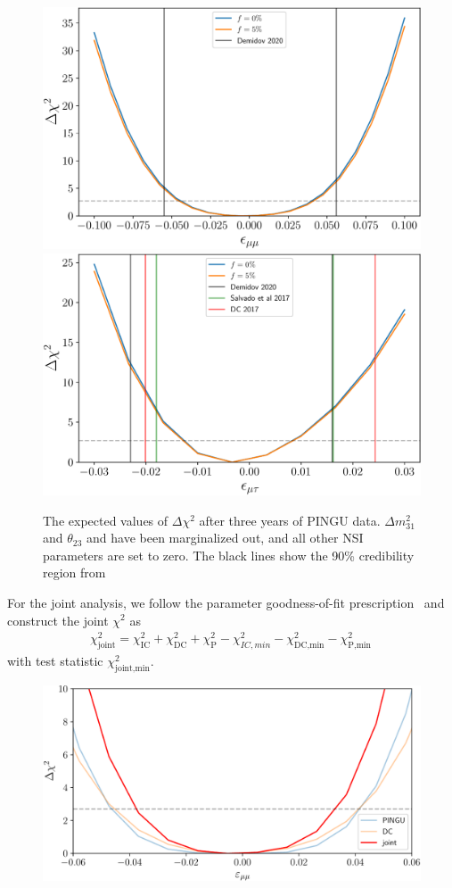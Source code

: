 \documentclass[draft=True]{revtex4-2}
\newcommand{\dm}{\Delta m^2_{31}}
\begin{document}
 \begin{figure}[!tb]
    \begin{center}
       \includegraphics[width=0.4\linewidth]{figures/DC_emm.pdf}
       \includegraphics[width=0.4\linewidth]{figures/DC_emt.pdf}
    \end{center}
    \caption{The expected values of $\Delta \chi^2$ after three years of PINGU data. $\dm$ and $\theta_{23}$ and have been marginalized out, and all other NSI 
    parameters are set to zero. The black lines show the 90\% credibility region from~\cite{demidov}}\label{fig:DC_3D_et}
 \end{figure}

For the joint analysis, we follow the parameter goodness-of-fit prescription~\cite{maltoni2003} and construct the joint $\chi^2$ as 
\begin{align}
    \chi^2_\text{joint} = \chi^2_\text{IC} + \chi^2_\text{DC} + \chi^2_\text{P} - \chi^2_{IC,min} - \chi^2_\text{DC,min} - \chi^2_\text{P,min}\,
\end{align}
with test statistic $\chi^2_\text{joint,min}$.

\begin{figure}[!tb]
    \begin{center}
       \includegraphics[width=0.4\linewidth]{figures/emm_deltachi.pdf}
    \end{center}
    \caption{}\label{fig:emm_deltachi}
 \end{figure}
\end{document}
